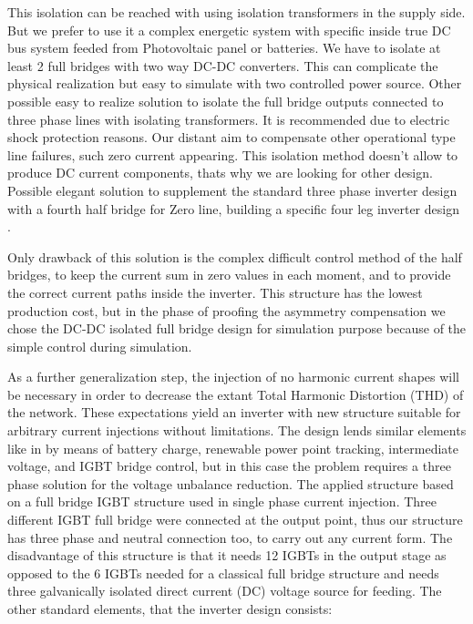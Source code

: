     This isolation can be reached  with using isolation transformers in the supply side. But we prefer to use it a complex energetic system with specific inside true DC bus system feeded from Photovoltaic panel or batteries. We have to isolate  at least 2 full bridges with two way DC-DC converters. This can complicate the physical realization but easy to simulate with two controlled power source. Other possible easy to realize solution to isolate the full bridge outputs  connected to three phase lines with isolating transformers. It is recommended due to electric shock protection reasons. Our distant aim to compensate other operational type line failures, such zero current appearing. This isolation method doesn't allow to produce DC current components, thats why we are looking for other design. Possible elegant solution to supplement the standard three phase inverter design with a fourth half bridge for Zero line, building a specific four leg inverter design \cite{Ninad2014control}.

    Only drawback of this solution is the complex difficult control method of the half bridges, to keep the current sum in zero values in each moment, and to provide the correct current paths inside the inverter. This structure has the lowest production cost, but in the phase of proofing the asymmetry compensation we chose the DC-DC isolated  full bridge design for simulation purpose because of the simple control during simulation.

    As a further generalization step, the injection of no harmonic current shapes will be necessary in order to decrease the extant Total Harmonic Distortion (THD) of the network. These expectations yield an inverter with new structure suitable for arbitrary current injections without limitations. The design lends similar elements like in \cite{gorbe2012reduction} by means of battery charge, renewable power point tracking, intermediate voltage, and IGBT bridge control, but in this case the problem requires a three phase solution for the voltage unbalance reduction. The applied structure based on a full bridge IGBT structure used in single phase current injection. Three different IGBT full bridge were connected at the output point, thus our structure has three phase and neutral connection too, to carry out any current form. The disadvantage of this structure is that it needs 12 IGBTs in the output stage as opposed to the 6 IGBTs needed for a classical full bridge structure and needs three galvanically isolated direct current (DC) voltage source for feeding.
    The other standard elements, that the inverter design consists:


